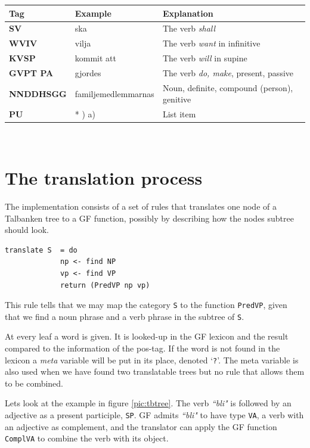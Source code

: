 \documentclass{report}
\begin{document}
\begin{tabular}{lll}
\textbf{Tag} & \textbf{Example} & \textbf{Explanation} \\
\hline
\textbf{SV} & ska & The verb \emph{shall}\\
\textbf{WVIV} & vilja & The verb \emph{want} in infinitive\\
\textbf{KVSP} & kommit att & The verb \emph{will} in supine\\
\textbf{GVPT  PA} & gjordes & The verb \emph{do, make}, present, passive \\
\textbf{NNDDHSGG} & familjemedlemmarnas & Noun, definite, compound (person), genitive \\
\textbf{PU} & * \; 1) \; a) & List item\\
\end{tabular}\\


\section{The translation process}
The implementation consists of a set of rules that translates
one node of a Talbanken tree to a GF function, possibly by describing how the
nodes subtree should look. 
\begin{verbatim}
translate S  = do
             np <- find NP
             vp <- find VP
             return (PredVP np vp)
\end{verbatim}
This rule tells that we may map the category \verb-S- to the function 
\verb-PredVP-, given that we find a noun phrase and a verb phrase in
the subtree of \verb-S-.

At every leaf a word is given. %
It is looked-up in the GF lexicon and the result compared to the information of
the pos-tag.
If the word is not found in the lexicon
a \textit{meta} variable will be put in its place, denoted `\verb-?-'.
The meta variable is also used when we have found two translatable trees
but no rule that allows them to be combined.

Lets look at the example in figure
\ref{pic:tbtree}. The verb \emph{``bli"} is
followed by an
adjective as a present participle, \verb|SP|. GF admits \emph{``bli"} to have
type \verb|VA|, a verb with an adjective as complement, and the translator can
apply the GF function \verb|ComplVA| to combine the verb with its object. \\
\end{document}
